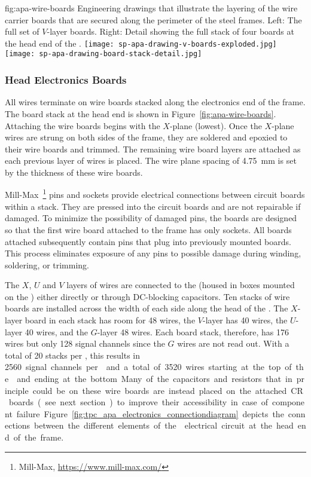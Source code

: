 \begin{dunefigure}{fig:apa-wire-boards}
{Engineering drawings that illustrate the layering of the wire carrier boards that are secured along the perimeter of the  steel frames. Left: The full set of $V$-layer boards.  Right: Detail showing the full stack of four boards at the head end of the .}
\texttt{[image: sp-apa-drawing-v-boards-exploded.jpg]}
\texttt{[image: sp-apa-drawing-board-stack-detail.jpg]}
\end{dunefigure}


\subsubsection{Head Electronics Boards}

All  wires terminate on wire boards stacked along the electronics end of the  frame.  The board stack at the head end is shown in Figure~\ref{fig:apa-wire-boards}. Attaching the wire boards begins with the $X$-plane (lowest). Once the $X$-plane wires are strung on both sides of the  frame, they are soldered and epoxied to their wire boards and trimmed. The remaining wire board layers are attached as each previous layer of wires is placed.  The wire plane spacing of \SI{4.75}{mm} is set by the thickness of these wire boards.   

Mill-Max~\footnote{Mill-Max\texttrademark{}, \url{https://www.mill-max.com/}} pins and sockets provide electrical connections between circuit boards within a stack. They are pressed into the circuit boards and are not repairable if damaged. To minimize the possibility of damaged pins, the boards are designed so that the first wire board attached to the frame has only sockets. All boards attached subsequently contain pins that plug into previously mounted boards. This process eliminates exposure of any pins to possible damage during winding, soldering, or trimming.

The $X$, $U$ and $V$ layers of wires are connected to the  (housed in boxes mounted on the ) either directly or through DC-blocking capacitors.  Ten stacks of wire boards are installed across the width of each side along the head of the .  The $X$-layer board in each stack has room for \num{48} wires, the $V$-layer has 40 wires, the $U$-layer \num{40} wires, and the $G$-layer \num{48} wires.  Each board stack, therefore, has 176 wires but only \num{128} signal channels since the $G$ wires are not read out. With a total of \num{20} stacks per , this results in \SI{2560} signal channels per  and a total of \SI{3520} wires starting at the top of the  and ending at the bottom. Many of the capacitors and resistors that in principle could be on these wire boards are instead placed on the attached CR boards (see next section) to improve their accessibility in case of component failure. Figure~\ref{fig:tpc_apa_electronics_connectiondiagram} depicts the connections between the different elements of the  electrical circuit at the head end of the frame. 

